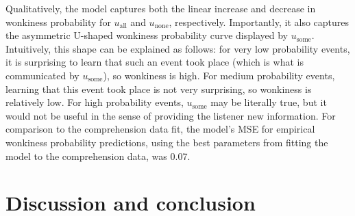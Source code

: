\documentclass[10pt,letterpaper]{article}
\newcommand{\red}[1]{\textcolor{Red}{#1}}
\begin{document}
Qualitatively, the model captures both the linear increase and decrease in wonkiness probability for $u_{\textrm{all}}$ and $u_{\textrm{none}}$, respectively. Importantly, it also captures the asymmetric U-shaped wonkiness probability curve displayed by $u_{\textrm{some}}$. Intuitively, this shape can be explained as follows: for very low probability events, it is surprising to learn that such an event took place (which is what is communicated by $u_{\textrm{some}}$), so wonkiness is high. For medium probability events, learning that this event took place is not very surprising, so wonkiness is relatively low. For high probability events, $u_{\textrm{some}}$ may be literally true, but it would not be useful in the sense of providing the listener new information. For comparison to the comprehension data fit, the model's MSE for empirical wonkiness probability predictions, using the best parameters from fitting the model to the comprehension data, was 0.07. 











\section{Discussion and conclusion}


\end{document}
